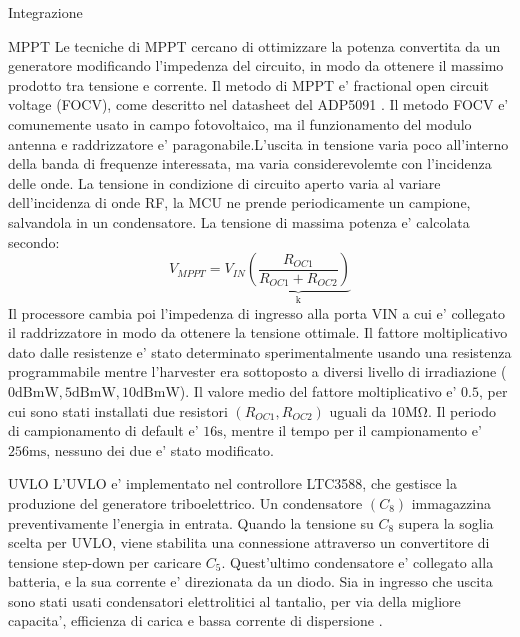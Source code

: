 \begin{section}{Integrazione}
    \begin{subsection}{MPPT}
        Le tecniche di MPPT cercano di ottimizzare la potenza convertita da un generatore modificando l'impedenza del circuito, in modo da ottenere il massimo prodotto tra tensione e corrente. Il metodo di MPPT e' fractional open circuit voltage (FOCV), come descritto nel datasheet del ADP5091 \cite{ADP5091DatasheetProduct}. Il metodo FOCV e' comunemente usato in campo fotovoltaico, ma il funzionamento del modulo antenna e raddrizzatore e' paragonabile.L'uscita in tensione varia poco all'interno della banda di frequenze interessata, ma varia considerevolemte con l'incidenza delle onde. La tensione in condizione di circuito aperto varia al variare dell'incidenza di onde RF, la MCU ne prende periodicamente un campione, salvandola in un condensatore. La tensione di massima potenza e' calcolata secondo:
        \begin{equation*}
            V_{MPPT} = V_{IN}\underbrace{\left(\frac{R_{OC1}}{R_{OC1}+R_{OC2}}\right)}_\mathrm{k}
         \end{equation*}
        Il processore cambia poi l'impedenza di ingresso alla porta VIN a cui e' collegato il raddrizzatore in modo da ottenere la tensione ottimale. Il fattore moltiplicativo dato dalle resistenze e' stato determinato sperimentalmente usando una resistenza programmabile mentre l'harvester era sottoposto a diversi livello di irradiazione (\(0\mathrm{dBmW},5\mathrm{dBmW},10\mathrm{dBmW}\)). Il valore medio del fattore moltiplicativo e' \(0.5\), per cui sono stati installati due resistori \((R_{OC1},R_{OC2})\) uguali da \(10\mathrm{M\Omega}\). Il periodo di campionamento di default e' \(16\mathrm{s}\), mentre il tempo per il campionamento e' \(256\mathrm{ms}\), nessuno dei due e' stato modificato.
    \end{subsection}

    \begin{subsection}{UVLO}
        L'UVLO e' implementato nel controllore LTC3588, che gestisce la produzione del generatore triboelettrico. Un condensatore \((C_8)\) immagazzina preventivamente l'energia in entrata. Quando la tensione su  \(C_8\) supera la soglia scelta per UVLO, viene stabilita una connessione attraverso un convertitore di tensione step-down per caricare \(C_5\). Quest'ultimo condensatore e' collegato alla batteria, e la sua corrente e' direzionata da un diodo. Sia in ingresso che uscita sono stati usati condensatori elettrolitici al tantalio, per via della migliore capacita', efficienza di carica e bassa corrente di dispersione \cite{torkiElectrolyticCapacitorProperties2023}.
    \end{subsection}


\end{section}
